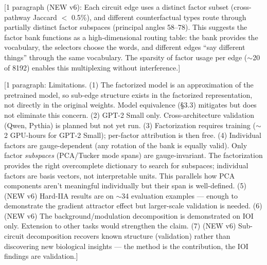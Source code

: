 \documentclass[11pt]{article}
\begin{document}
[1 paragraph (NEW v6): Each circuit edge uses a distinct factor subset
(cross-pathway Jaccard $<$ 0.5\%), and different counterfactual types
route through partially distinct factor subspaces (principal angles
58--78\textdegree). This suggests the factor bank functions as a
high-dimensional routing table: the bank provides the vocabulary, the
selectors choose the words, and different edges ``say different things''
through the same vocabulary. The sparsity of factor usage per edge
($\sim$20 of 8192) enables this multiplexing without interference.]



[1 paragraph: Limitations. (1) The factorized model is an approximation
of the pretrained model, so sub-edge structure exists in the factorized
representation, not directly in the original weights. Model equivalence
(\S3.3) mitigates but does not eliminate this concern.
(2) GPT-2 Small only. Cross-architecture validation (Qwen, Pythia) is
planned but not yet run.
(3) Factorization requires training ($\sim$2 GPU-hours for GPT-2 Small);
per-factor attribution is then free.
(4) Individual factors are gauge-dependent (any rotation of the bank is
equally valid). Only factor \emph{subspaces} (PCA/Tucker mode spans) are
gauge-invariant. The factorization provides the right overcomplete
dictionary to search for subspaces; individual factors are basis vectors,
not interpretable units. This parallels how PCA components aren't
meaningful individually but their span is well-defined.
(5) (NEW v6) Hard-IIA results are on $\sim$34 evaluation examples ---
enough to demonstrate the gradient attractor effect but larger-scale
validation is needed.
(6) (NEW v6) The background/modulation decomposition is demonstrated on
IOI only. Extension to other tasks would strengthen the claim.
(7) (NEW v6) Sub-circuit decomposition recovers known structure
(validation) rather than discovering new biological insights --- the
method is the contribution, the IOI findings are validation.]

\end{document}

